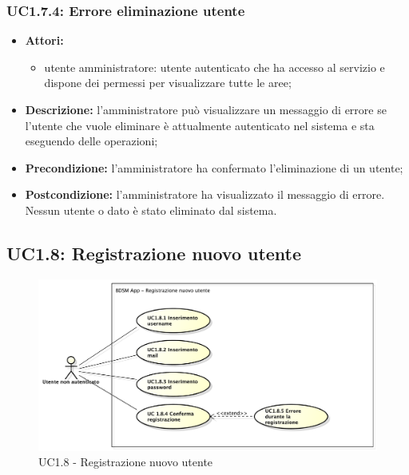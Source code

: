 \subsubsection{UC1.7.4: Errore eliminazione utente}


\begin{itemize}
	\item \textbf{Attori:}
	\begin{itemize}
		\item utente amministratore: utente autenticato che ha accesso al servizio e dispone dei permessi per visualizzare tutte le aree;
	\end{itemize}
	\item \textbf{Descrizione:} l'amministratore può visualizzare un messaggio di errore se l'utente che vuole eliminare è attualmente autenticato nel sistema e sta eseguendo delle operazioni;
	\item \textbf{Precondizione:} l'amministratore ha confermato l'eliminazione di un utente;
	\item \textbf{Postcondizione:} l'amministratore ha visualizzato il messaggio di errore. Nessun utente o dato è stato eliminato dal sistema.
\end{itemize}

\pagebreak


\subsection{UC1.8: Registrazione nuovo utente}

\begin{figure}[!htbp]
	\centering
	\centerline{\includegraphics[scale=0.45]{./images/UC1_8.pdf}}
	\caption{UC1.8 - Registrazione nuovo utente}
\end{figure}

